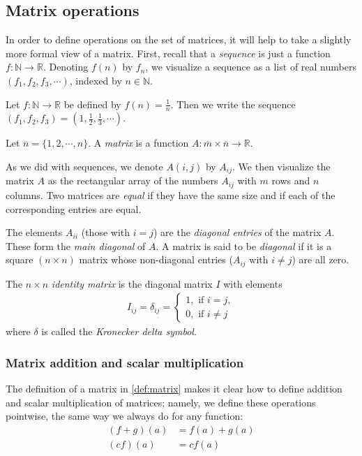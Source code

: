 \documentclass[12pt,letterpaper,reqno]{article}
\numberwithin{equation}{section}
\newcommand{\ti}[1]{\textit{#1}}
\newcommand{\fixme}[1]{{\color{orange}{[#1]}}}
\begin{document}
\subsection{Matrix operations}
In order to define operations on the set of matrices, it will help to take a slightly more formal view of a matrix. First, recall that a \ti{sequence} is just a function $f:\mathbb{N} \to \mathbb{R}$. Denoting $f(n)$ by $f_n$, we visualize a sequence as a list of real numbers $(f_1,f_2,f_3,\cdots)$, indexed by $n \in \mathbb{N}$.

\begin{example}
Let $f:\mathbb{N} \to \mathbb{R}$ be defined by $f(n)=\frac{1}{n}$. Then we write the sequence $(f_1,f_2,f_3)=(1,\frac{1}{2},\frac{1}{3},\cdots)$.	
\end{example}

\begin{defn}[Matrix]\label{def:matrix}
Let $\overline{n}=\{1,2,\cdots,n\}$. A \ti{matrix} is a function $A:\overline{m} \times \overline{n} \to \mathbb{R}$.	
\end{defn}

As we did with sequences, we denote $A(i,j)$ by $A_{ij}$. We then visualize the matrix $A$ as the rectangular array of the numbers $A_{ij}$ with $m$ rows and $n$ columns. Two matrices are \ti{equal} if they have the same size and if each of the corresponding entries are equal.

\begin{defn}
\fixme{Do we use this for anything here? Should this be moved?}
	The elements $A_{ii}$ (those with $i=j$) are the \ti{diagonal entries} of the matrix $A$. These form the \ti{main diagonal} of $A$. A matrix is said to be \ti{diagonal} if it is a square $(n \times n)$ matrix whose non-diagonal entries ($A_{ij}$ with $i \neq j$) are all zero.	
\end{defn}

\begin{example}
The $n \times n$ \ti{identity matrix} is the diagonal matrix $I$ with elements
\begin{align*}
	I_{ij}=\delta_{ij}=\begin{cases}
		1, \text{ if } i=j, \\
		0, \text{ if } i \neq j
	\end{cases}	
	\end{align*}
where $\delta$ is called the \ti{Kronecker delta symbol}.
\end{example}

\subsubsection{Matrix addition and scalar multiplication}
The definition of a matrix in \ref{def:matrix} makes it clear how to define addition and scalar multiplication of matrices; namely, we define these operations pointwise, the same way we always do for any function: 
\begin{align*}
	(f+g)(a) &=f(a)+g(a) \\
	(cf)(a) &=cf(a) 
\end{align*}
\end{document}
